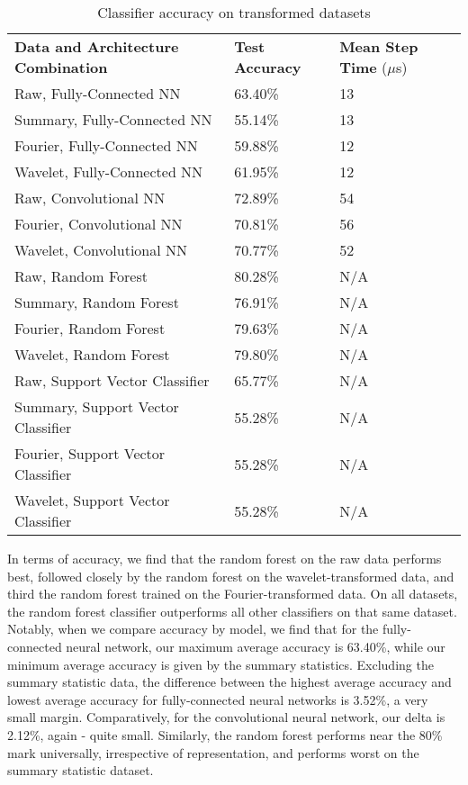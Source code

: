 \begin{table}[h]
\centering	
\begin{tabular}{l|ll}
\textbf{Data and Architecture Combination} & \textbf{Test Accuracy} & \textbf{Mean Step Time} ($\mu$s) \\\cline{1-3}
Raw, Fully-Connected NN            & 63.40\%         & 13\\
Summary, Fully-Connected NN        & 55.14\%         & 13\\
Fourier, Fully-Connected NN        & 59.88\%         & 12\\
Wavelet, Fully-Connected NN        & 61.95\%         & 12\\
\hline
Raw, Convolutional NN              & 72.89\%         & 54\\
Fourier, Convolutional NN          & 70.81\%         & 56\\
Wavelet, Convolutional NN          & 70.77\%         & 52\\
\hline
Raw, Random Forest                 & 80.28\%         & N/A\\ 
Summary, Random Forest             & 76.91\%         & N/A\\
Fourier, Random Forest             & 79.63\%         & N/A\\
Wavelet, Random Forest             & 79.80\%         & N/A\\
\hline
Raw, Support Vector Classifier     & 65.77\%         & N/A\\    
Summary, Support Vector Classifier & 55.28\%         & N/A\\  
Fourier, Support Vector Classifier & 55.28\%         & N/A\\  
Wavelet, Support Vector Classifier & 55.28\%         & N/A           
\end{tabular}
\caption{Classifier accuracy on transformed datasets}
\label{Tab:malware_test}
\end{table}

In terms of accuracy, we find that the random forest on the raw data performs best, followed closely by the random forest on the wavelet-transformed data, and third the random forest trained on the Fourier-transformed data. 
On all datasets, the random forest classifier outperforms all other classifiers on that same dataset.
Notably, when we compare accuracy by model, we find that for the fully-connected neural network, our maximum average accuracy is 63.40\%, while our minimum average accuracy is given by the summary statistics.
Excluding the summary statistic data, the difference between the highest average accuracy and lowest average accuracy for fully-connected neural networks is 3.52\%, a very small margin. 
Comparatively, for the convolutional neural network, our delta is 2.12\%, again - quite small. 
Similarly, the random forest performs near the 80\% mark universally, irrespective of representation, and performs worst on the summary statistic dataset.

